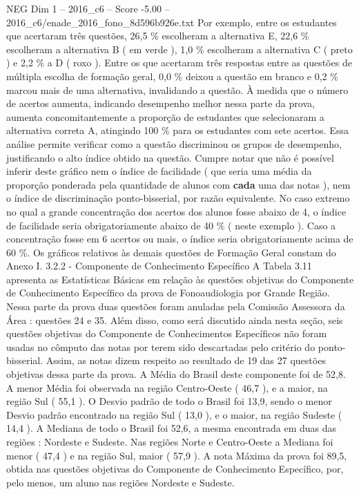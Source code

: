 \begin{textsample}{NEG Dim 1 – 2016\_c6 – Score -5.00 – 2016\_c6/enade\_2016\_fono\_8d596b926e.txt}
Por exemplo, entre os estudantes que acertaram três questões, 26,5 \% escolheram a alternativa E, 22,6 \% escolheram a alternativa B ( em verde ), 1,0 \% escolheram a alternativa C ( preto ) e 2,2 \% a D ( roxo ).
Entre os que acertaram três respostas entre as questões de múltipla escolha de formação geral, 0,0 \% deixou a questão em branco e 0,2 \% marcou mais de uma alternativa, invalidando a questão.
À medida que o número de acertos aumenta, indicando desempenho melhor nessa parte da prova, aumenta concomitantemente a proporção de estudantes que selecionaram a alternativa correta A, atingindo 100 \% para os estudantes com sete acertos.
Essa análise permite verificar como a questão discriminou os grupos de desempenho, justificando o alto índice obtido na questão.
Cumpre notar que não é possível inferir deste gráfico nem o índice de facilidade ( que seria uma média da proporção ponderada pela quantidade de alunos com \textbf{cada} uma das notas ), nem o índice de discriminação ponto-bisserial, por razão equivalente.
No caso extremo no qual a grande concentração dos acertos dos alunos fosse abaixo de 4, o índice de facilidade seria obrigatoriamente abaixo de 40 \% ( neste exemplo ).
Caso a concentração fosse em 6 acertos ou mais, o índice seria obrigatoriamente acima de 60 \%.
Os gráficos relativos às demais questões de Formação Geral constam do Anexo I. 3.2.2 - Componente de Conhecimento Específico A Tabela 3.11 apresenta as Estatísticas Básicas em relação às questões objetivas do Componente de Conhecimento Específico da prova de Fonoaudiologia por Grande Região.
Nessa parte da prova duas questões foram anuladas pela Comissão Assessora da Área : questões 24 e 35.
Além disso, como será discutido ainda nesta seção, seis questões objetivas do Componente de Conhecimentos Específicos não foram usadas no cômputo das notas por terem sido descartadas pelo critério do ponto-bisserial.
Assim, as notas dizem respeito ao resultado de 19 das 27 questões objetivas dessa parte da prova.
A Média do Brasil deste componente foi de 52,8.
A menor Média foi observada na região Centro-Oeste ( 46,7 ), e a maior, na região Sul ( 55,1 ).
O Desvio padrão de todo o Brasil foi 13,9, sendo o menor Desvio padrão encontrado na região Sul ( 13,0 ), e o maior, na região Sudeste ( 14,4 ).
A Mediana de todo o Brasil foi 52,6, a mesma encontrada em duas das regiões : Nordeste e Sudeste.
Nas regiões Norte e Centro-Oeste a Mediana foi menor ( 47,4 ) e na região Sul, maior ( 57,9 ).
A nota Máxima da prova foi 89,5, obtida nas questões objetivas do Componente de Conhecimento Específico, por, pelo menos, um aluno nas regiões Nordeste e Sudeste.

\end{textsample}
